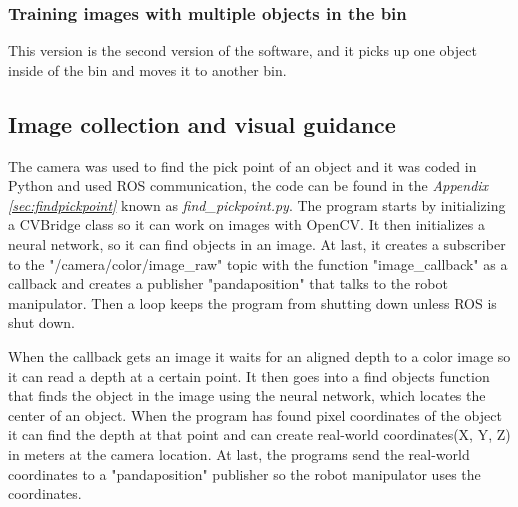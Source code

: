 \subsubsection{Training images with multiple objects in the bin}
This version is the second version of the software, and it picks up one object inside of the bin and moves it to another bin.




\subsection{Image collection and visual guidance}\label{camera}
The camera was used to find the pick point of an object and it was coded in Python and used ROS communication, the code can be found in the \textit{Appendix \ref{sec:findpickpoint}} known as \textit{find\_pickpoint.py}. 
The program starts by initializing a CVBridge class so it can work on images with OpenCV. It then initializes a neural network, so it can find objects in an image. At last, it creates a subscriber to the "/camera/color/image\_raw" topic with the function "image\_callback" as a callback and creates a publisher "pandaposition" that talks to the robot manipulator. Then a loop keeps the program from shutting down unless ROS is shut down.

When the callback gets an image it waits for an aligned depth to a color image so it can read a depth at a certain point. It then goes into a find objects function that finds the object in the image using the neural network, which locates the center of an object. When the program has found pixel coordinates of the object it can find the depth at that point and can create real-world coordinates(X, Y, Z) in meters at the camera location. At last, the programs send the real-world coordinates to a "pandaposition" publisher so the robot manipulator uses the coordinates.

